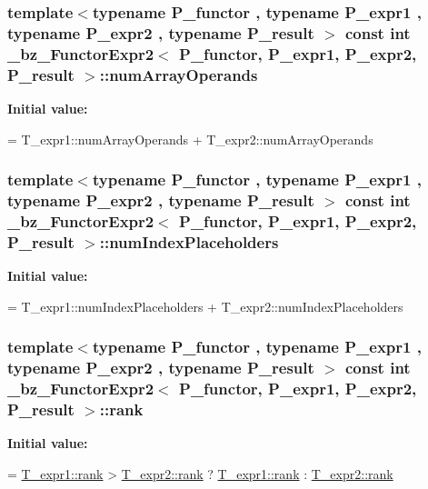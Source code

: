 \subsubsection[{num\+Array\+Operands}]{\setlength{\rightskip}{0pt plus 5cm}template$<$typename P\+\_\+functor , typename P\+\_\+expr1 , typename P\+\_\+expr2 , typename P\+\_\+result $>$ const int {\bf \+\_\+bz\+\_\+\+Functor\+Expr2}$<$ P\+\_\+functor, P\+\_\+expr1, P\+\_\+expr2, P\+\_\+result $>$\+::num\+Array\+Operands\hspace{0.3cm}{\ttfamily [static]}}\label{class__bz__FunctorExpr2_a6aa783855d43f08337c2383a52a73f91}
{\bfseries Initial value\+:}
\begin{DoxyCode}
= T\_expr1::numArrayOperands
                         + T\_expr2::numArrayOperands
\end{DoxyCode}
\hypertarget{class__bz__FunctorExpr2_a16d77fdff3f0bda6610cf8885e5044a9}{}
\subsubsection[{num\+Index\+Placeholders}]{\setlength{\rightskip}{0pt plus 5cm}template$<$typename P\+\_\+functor , typename P\+\_\+expr1 , typename P\+\_\+expr2 , typename P\+\_\+result $>$ const int {\bf \+\_\+bz\+\_\+\+Functor\+Expr2}$<$ P\+\_\+functor, P\+\_\+expr1, P\+\_\+expr2, P\+\_\+result $>$\+::num\+Index\+Placeholders\hspace{0.3cm}{\ttfamily [static]}}\label{class__bz__FunctorExpr2_a16d77fdff3f0bda6610cf8885e5044a9}
{\bfseries Initial value\+:}
\begin{DoxyCode}
= T\_expr1::numIndexPlaceholders
                         + T\_expr2::numIndexPlaceholders
\end{DoxyCode}
\hypertarget{class__bz__FunctorExpr2_a616c1f8074580cb40a382bd2344319a2}{}
\subsubsection[{rank}]{\setlength{\rightskip}{0pt plus 5cm}template$<$typename P\+\_\+functor , typename P\+\_\+expr1 , typename P\+\_\+expr2 , typename P\+\_\+result $>$ const int {\bf \+\_\+bz\+\_\+\+Functor\+Expr2}$<$ P\+\_\+functor, P\+\_\+expr1, P\+\_\+expr2, P\+\_\+result $>$\+::rank\hspace{0.3cm}{\ttfamily [static]}}\label{class__bz__FunctorExpr2_a616c1f8074580cb40a382bd2344319a2}
{\bfseries Initial value\+:}
\begin{DoxyCode}
= \hyperlink{zfftnd_8c_a6cfd95afd0afebd625b889fb6e58371c}{T\_expr1::rank} > \hyperlink{zfftnd_8c_a6cfd95afd0afebd625b889fb6e58371c}{T\_expr2::rank}
             ? \hyperlink{zfftnd_8c_a6cfd95afd0afebd625b889fb6e58371c}{T\_expr1::rank} : \hyperlink{zfftnd_8c_a6cfd95afd0afebd625b889fb6e58371c}{T\_expr2::rank}
\end{DoxyCode}


